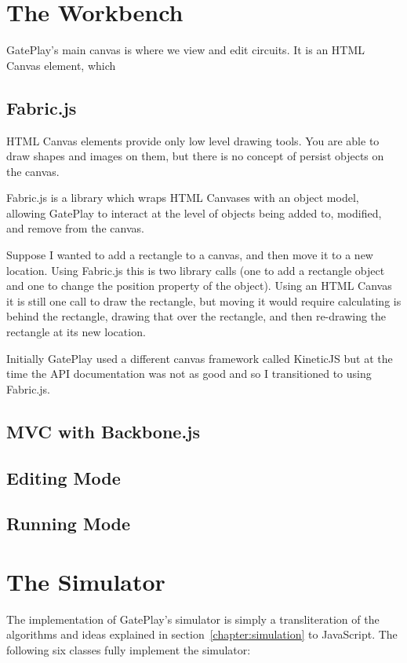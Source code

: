 \section{The Workbench}

GatePlay's main canvas is where we view and edit circuits. It is an HTML Canvas element, which


\subsection{Fabric.js}
HTML Canvas elements provide only low level drawing tools. You are able to draw shapes and images on them, but there is no concept of persist objects on the canvas.

Fabric.js is a library which wraps HTML Canvases with an object model, allowing GatePlay to interact at the level of objects being added to, modified, and remove from the canvas. 

Suppose I wanted to add a rectangle to a canvas, and then move it to a new location. Using Fabric.js this is two library calls (one to add a rectangle object and one to change the position property of the object). Using an HTML Canvas it is still one call to draw the rectangle, but moving it would require calculating is behind the rectangle, drawing that over the rectangle, and then re-drawing the rectangle at its new location.

Initially GatePlay used a different canvas framework called KineticJS but at the time the API documentation was not as good and so I transitioned to using Fabric.js.

\subsection{MVC with Backbone.js}

\subsection{Editing Mode}

\subsection{Running Mode}

\section{The Simulator}
The implementation of GatePlay's simulator is simply a transliteration of the algorithms and ideas explained in section~\ref{chapter:simulation} to JavaScript. The following six classes fully implement the simulator:

